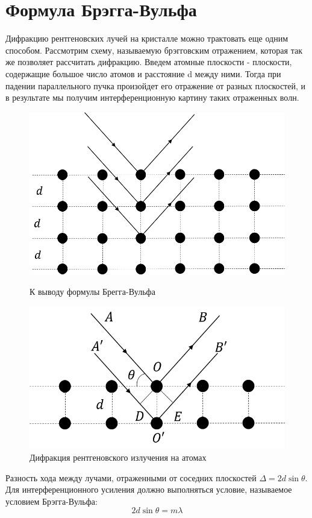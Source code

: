 \documentclass[12pt]{kiarticle} %
\begin{document}
\section{Формула Брэгга-Вульфа}
Дифракцию рентгеновских лучей на кристалле можно трактовать еще одним способом. Рассмотрим схему, называемую брэгговским отражением, которая так же позволяет рассчитать дифракцию. Введем атомные плоскости - плоскости, содержащие большое число атомов и расстояние d между ними. Тогда при падении параллельного пучка произойдет его отражение от разных плоскостей, и в результате мы получим интерференционную картину таких отраженных волн. 
\begin{figure}[H]
	\begin{center}
		\begin{minipage}[h]{0.4\linewidth}
			\includegraphics[width=1\linewidth]{pic2.png}
			\caption{К выводу формулы Брегга-Вульфа} 
			
		\end{minipage}
		\hfill
		\begin{minipage}[h]{0.4\linewidth}
			\includegraphics[width=1\linewidth]{pic3.png}
			\caption{Дифракция рентгеновского излучения на атомах}
			
		\end{minipage}
	\end{center}
\end{figure}
Разность хода между лучами, отраженными от соседних плоскостей $\Delta = 2 d \sin \theta$. Для интерференционного усиления должно выполняться условие, называемое условием Брэгга-Вульфа: 
\[ 2 d \sin \theta = m \lambda\]
\end{document}
